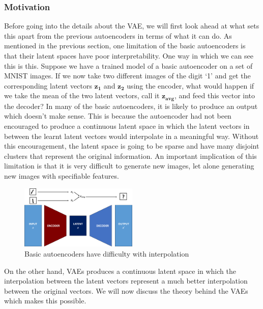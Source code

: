             \subsubsection{Motivation}
                Before going into the details about the VAE\citep{kingma2013auto}, we will first look ahead at what sets this apart from the previous autoencoders in terms of what it can do. As mentioned in the previous section, one limitation of the basic autoencoders is that their latent spaces have poor interpretability. One way in which we can see this is this. Suppose we have a trained model of a basic autoencoder on a set of MNIST images. If we now take two different images of the digit `1' and get the corresponding latent vectors $\bm{z_1}$ and $\bm{z_2}$ using the encoder, what would happen if we take the mean of the two latent vectors, call it $\bm{z_{avg}}$, and feed this vector into the decoder? In many of the basic autoencoders, it is likely to produce an output which doesn't make sense. This is because the autoencoder had not been encouraged to produce a continuous latent space in which the latent vectors in between the learnt latent vectors would interpolate in a meaningful way. Without this encouragement, the latent space is going to be sparse and have many disjoint clusters that represent the original information. An important implication of this limitation is that it is very difficult to generate new images, let alone generating new images with specifiable features.
                
                \begin{figure}[H] \label{fig:int_fail}
                    \centering
                    \includegraphics[width=0.5\textwidth]{imgs/interpolation_fail.png}
                    \caption{Basic autoencoders have difficulty with interpolation}
                \end{figure}
                
                On the other hand, VAEs produces a continuous latent space in which the interpolation between the latent vectors represent a much better interpolation between the original vectors. We will now discuss the theory behind the VAEs which makes this possible.
                
